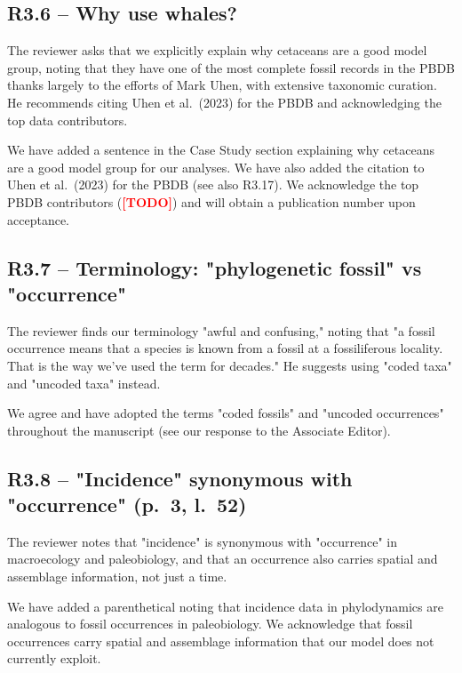 \documentclass[11pt]{article}
\newcommand{\response}[1]{\noindent\textcolor{resp}{#1}\medskip}
\newcommand{\todo}{\noindent\textcolor{red}{\textbf{[TODO]}}\medskip}
\begin{document}
\subsection*{R3.6 -- Why use whales?}

The reviewer asks that we explicitly explain why cetaceans are a good model group, noting that they have one of the most complete fossil records in the PBDB thanks largely to the efforts of Mark Uhen, with extensive taxonomic curation. He recommends citing Uhen et al.\ (2023) for the PBDB and acknowledging the top data contributors.

\response{We have added a sentence in the Case Study section explaining why cetaceans are a good model group for our analyses. We have also added the citation to Uhen et al.\ (2023) for the PBDB (see also R3.17). We acknowledge the top PBDB contributors (\todo) and will obtain a publication number upon acceptance.}

\subsection*{R3.7 -- Terminology: "phylogenetic fossil" vs "occurrence"}

The reviewer finds our terminology "awful and confusing," noting that "a fossil occurrence means that a species is known from a fossil at a fossiliferous locality. That is the way we've used the term for decades." He suggests using "coded taxa" and "uncoded taxa" instead.

\response{We agree and have adopted the terms "coded fossils" and "uncoded occurrences" throughout the manuscript (see our response to the Associate Editor).}

\subsection*{R3.8 -- "Incidence" synonymous with "occurrence" (p.\ 3, l.\ 52)}

The reviewer notes that "incidence" is synonymous with "occurrence" in macroecology and paleobiology, and that an occurrence also carries spatial and assemblage information, not just a time.

\response{We have added a parenthetical noting that incidence data in phylodynamics are analogous to fossil occurrences in paleobiology. We acknowledge that fossil occurrences carry spatial and assemblage information that our model does not currently exploit.}
\end{document}
